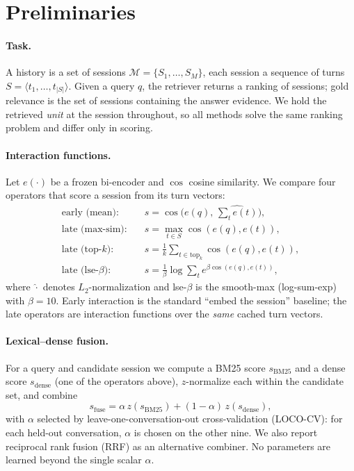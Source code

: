 \documentclass[10pt,twocolumn]{article}
\begin{document}
\section{Preliminaries}
\label{sec:prelim}
\paragraph{Task.}
A history is a set of sessions $\mathcal{M}=\{S_1,\dots,S_M\}$, each session a
sequence of turns $S=\langle t_1,\dots,t_{|S|}\rangle$. Given a query $q$, the
retriever returns a ranking of sessions; gold relevance is the set of sessions
containing the answer evidence. We hold the retrieved \emph{unit} at the
session throughout, so all methods solve the same ranking problem and differ
only in scoring.

\paragraph{Interaction functions.}
Let $e(\cdot)$ be a frozen bi-encoder and $\cos$ cosine similarity. We compare
four operators that score a session from its turn vectors:
\begin{align}
\text{early (mean):}\quad & s = \cos\!\big(e(q),\, \widehat{\textstyle\sum_t e(t)}\big),\\
\text{late (max-sim):}\quad & s = \max_{t\in S}\cos(e(q),e(t)),\\
\text{late (top-}k\text{):}\quad & s = \tfrac{1}{k}\!\!\sum_{t\in \mathrm{top}_k}\!\!\cos(e(q),e(t)),\\
\text{late (lse-}\beta\text{):}\quad & s = \tfrac{1}{\beta}\log\!\textstyle\sum_t e^{\beta\cos(e(q),e(t))},
\end{align}
where $\widehat{\cdot}$ denotes $L_2$-normalization and lse-$\beta$ is the
smooth-max (log-sum-exp) with $\beta{=}10$. Early interaction is the standard
``embed the session'' baseline; the late operators are interaction functions
over the \emph{same} cached turn vectors.

\paragraph{Lexical--dense fusion.}
For a query and candidate session we compute a BM25 score $s_{\mathrm{BM25}}$
and a dense score $s_{\mathrm{dense}}$ (one of the operators above),
$z$-normalize each within the candidate set, and combine
\begin{equation}
s_{\mathrm{fuse}} = \alpha\, z(s_{\mathrm{BM25}}) + (1-\alpha)\, z(s_{\mathrm{dense}}),
\label{eq:fuse}
\end{equation}
with $\alpha$ selected by leave-one-conversation-out cross-validation
(LOCO-CV): for each held-out conversation, $\alpha$ is chosen on the other
nine. We also report reciprocal rank fusion (RRF) \citep{rrf} as an
alternative combiner. No parameters are learned beyond the single scalar
$\alpha$.
\end{document}
